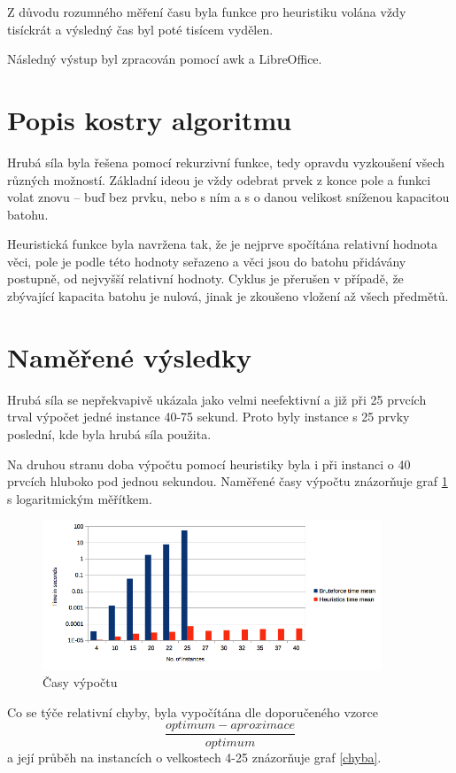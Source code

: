 \documentclass[a4paper]{article}
\begin{document}
	Z důvodu rozumného měření času byla funkce pro heuristiku volána vždy tisíckrát a výsledný čas byl poté tisícem vydělen.
	
	Následný výstup byl zpracován pomocí awk a LibreOffice.

\section{Popis kostry algoritmu}
	Hrubá síla byla řešena pomocí rekurzivní funkce, tedy opravdu vyzkoušení všech různých možností. Základní ideou je vždy odebrat prvek z konce pole a funkci volat znovu -- buď bez prvku, nebo s ním a s o danou velikost sníženou kapacitou batohu.
	
	Heuristická funkce byla navržena tak, že je nejprve spočítána relativní hodnota věci, pole je podle této hodnoty seřazeno a věci jsou do batohu přidávány postupně, od nejvyšší relativní hodnoty. Cyklus je přerušen v případě, že zbývající kapacita batohu je nulová, jinak je zkoušeno vložení až všech předmětů.

\section{Naměřené výsledky}
	Hrubá síla se nepřekvapivě ukázala jako velmi neefektivní a již při 25 prvcích trval výpočet jedné instance 40-75 sekund. Proto byly instance s 25 prvky poslední, kde byla hrubá síla použita.
	
	Na druhou stranu doba výpočtu pomocí heuristiky byla i při instanci o 40 prvcích hluboko pod jednou sekundou. Naměřené časy výpočtu znázorňuje  graf \ref{cas} s logaritmickým měřítkem.
	\begin{figure}[h]
		\includegraphics[width=0.9\textwidth]{cas_vypoctu.png} \caption{Časy výpočtu} \label{cas} 
	\end{figure}
	

	Co se týče relativní chyby, byla vypočítána dle doporučeného vzorce \begin{equation}\frac{optimum - aproximace}{optimum}\end{equation} a její průběh na instancích o velkostech 4-25 znázorňuje graf \ref{chyba}.
	
\end{document}
